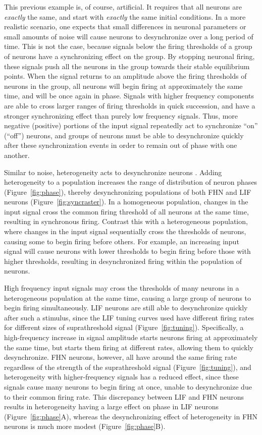 \documentclass[12pt]{article}
\begin{document}
This previous example is, of course, artificial. It requires that all neurons are \emph{exactly} the same, and start with \emph{exactly} the same initial conditions. In a more realistic scenario, one expects that small differences in neuronal parameters or small amounts of noise will cause neurons to desynchronize over a long period of time. This is not the case, because signals below the firing thresholds of a group of neurons have a synchronizing effect on the group. By stopping neuronal firing, these signals push all the neurons in the group towards their stable equilibrium points. When the signal returns to an amplitude above the firing thresholds of neurons in the group, all neurons will begin firing at approximately the same time, and will be once again in phase. Signals with higher frequency components are able to cross larger ranges of firing thresholds in quick succession, and have a stronger synchronizing effect than purely low frequency signals. Thus, more negative (positive) portions of the input signal repeatedly act to synchronize ``on'' (``off'') neurons, and groups of neurons must be able to desynchronize quickly after these synchronization events in order to remain out of phase with one another.

Similar to noise, heterogeneity acts to desynchronize neurons \citep{Burton2012}. Adding heterogeneity to a population increases the range of distribution of neuron phases (Figure~\ref{fig:phase}), thereby desynchronizing populations of both FHN and LIF neurons (Figure~\ref{fig:syncraster}). In a homogeneous population, changes in the input signal cross the common firing threshold of all neurons at the same time, resulting in synchronous firing. Contrast this with a heterogeneous population, where changes in the input signal sequentially cross the thresholds of neurons, causing some to begin firing before others. For example, an increasing input signal will cause neurons with lower thresholds to begin firing before those with higher thresholds, resulting in desynchronized firing within the population of neurons.

High frequency input signals may cross the thresholds of many neurons in a heterogeneous population at the same time, causing a large group of neurons to begin firing simultaneously. LIF neurons are still able to desynchronize quickly after such a stimulus, since the LIF tuning curves used have different firing rates for different sizes of suprathreshold signal (Figure~\ref{fig:tuning}). Specifically, a high-frequency increase in signal amplitude starts neurons firing at approximately the same time, but starts them firing at different rates, allowing them to quickly desynchronize. FHN neurons, however, all have around the same firing rate regardless of the strength of the suprathreshold signal (Figure~\ref{fig:tuning}), and heterogeneity with higher-frequency signals has a reduced effect, since these signals cause many neurons to begin firing at once, unable to desynchronize due to their common firing rate. This discrepancy between LIF and FHN neurons results in heterogeneity having a large effect on phase in LIF neurons (Figure~\ref{fig:phase}A), whereas the desynchronizing effect of heterogeneity in FHN neurons is much more modest (Figure~\ref{fig:phase}B).
\end{document}

